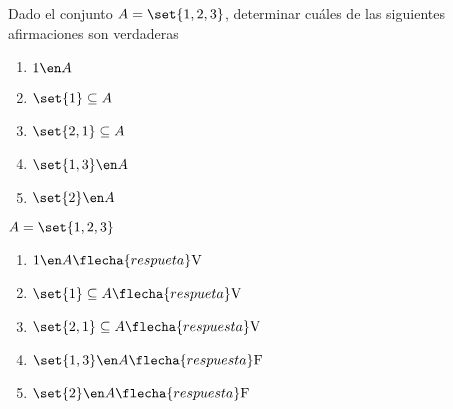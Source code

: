 \ejercicio
Dado el conjunto $A = \set{1,2,3}$, determinar cuáles de las siguientes afirmaciones son verdaderas

\begin{multicols}{5}
	\begin{enumerate}[label=(\roman*)]
		\item $1 \en A $
		\item $\set{1} \subseteq A $
		\item $\set{2,1} \subseteq A $
		\item $\set{1,3} \en A $
		\item $\set{2} \en A $
	\end{enumerate}
\end{multicols}

\separadorCorto

$A = \set{1,2,3}$
\begin{multicols}{2}
	\begin{enumerate}[label=(\roman*)]
		\item $1 \en A \flecha{respueta} \text{V}$
		\item $\set{1} \subseteq A \flecha{respueta} \text{V}$
		\item $\set{2,1} \subseteq A \flecha{respuesta} \text{V}$
		\item $\set{1,3} \en A \flecha{respuesta} \text{F}$
		\item $\set{2} \en A \flecha{respuesta} \text{F}$
	\end{enumerate}
\end{multicols}

